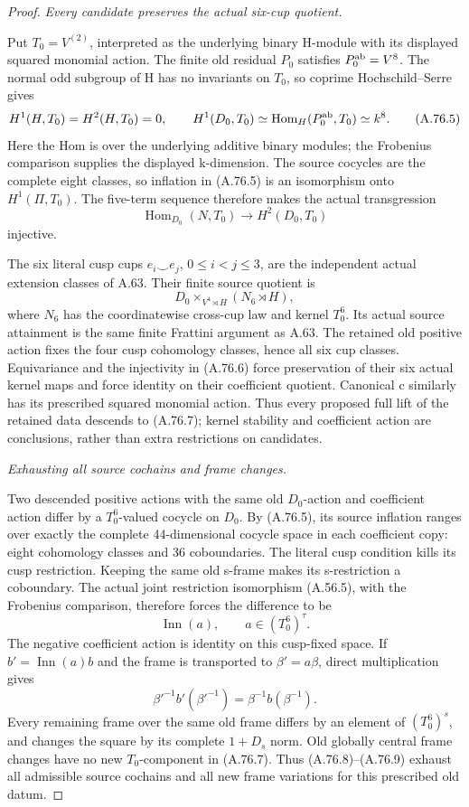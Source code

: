 \begin{proof}
\emph{Every candidate preserves the actual six-cup quotient.}\par
Put \(T_0=V^{(2)}\), interpreted as the underlying binary
H-module with its displayed squared monomial action. The finite
old residual \(P_0\) satisfies \(P_0^{\rm ab}=V^8\).
The normal odd subgroup of H has no invariants on \(T_0\), so
coprime Hochschild--Serre gives
\[
 H^1(H,T_0)=H^2(H,T_0)=0,
 \qquad H^1(D_0,T_0)
       \simeq\operatorname{Hom}_H(P_0^{\rm ab},T_0)
       \simeq k^8.
 \tag{A.76.5}
\]
Here the Hom is over the underlying additive binary modules;
the Frobenius comparison supplies the displayed k-dimension.
The source cocycles are the complete eight classes, so inflation
in (A.76.5) is an isomorphism onto \(H^1(\Pi,T_0)\).
The five-term sequence therefore makes the actual transgression
\[
 \operatorname{Hom}_{D_0}(N,T_0)
              \longrightarrow H^2(D_0,T_0)
 \tag{A.76.6}
\]
injective.

The six literal cusp cups \(e_i\smile e_j\), \(0\leq i<j\leq3\),
are the independent actual extension classes of A.63. Their finite
source quotient is
\[
 D_0\mathbin{\times}_{V^4\rtimes H}(N_6\rtimes H),
 \tag{A.76.7}
\]
where \(N_6\) has the coordinatewise cross-cup law and kernel
\(T_0^6\). Its actual source attainment is the same finite
Frattini argument as A.63. The retained old positive action fixes
the four cusp cohomology classes, hence all six cup classes.
Equivariance and the injectivity in (A.76.6) force preservation
of their six actual kernel maps and force identity on their
coefficient quotient. Canonical c similarly has its prescribed
squared monomial action. Thus every proposed full lift of the
retained data descends to (A.76.7); kernel stability and coefficient
action are conclusions, rather than extra restrictions on candidates.

\emph{Exhausting all source cochains and frame changes.}\par
Two descended positive actions with the same old \(D_0\)-action
and coefficient action differ by a \(T_0^6\)-valued cocycle on
\(D_0\). By (A.76.5), its source inflation ranges over exactly
the complete 44-dimensional cocycle space in each coefficient
copy: eight cohomology classes and 36 coboundaries. The literal
cusp condition kills its cusp restriction. Keeping the same old
s-frame makes its s-restriction a coboundary. The actual joint
restriction isomorphism (A.56.5), with the Frobenius comparison,
therefore forces the difference to be
\[
 \operatorname{Inn}(a),\qquad a\in(T_0^6)^\tau.
 \tag{A.76.8}
\]
The negative coefficient action is identity on this cusp-fixed
space. If \(b'=\operatorname{Inn}(a)b\) and the frame is
transported to \(\beta'=a\beta\), direct multiplication gives
\[
 \beta'^{-1}b'(\beta'^{-1})
                 =\beta^{-1}b(\beta^{-1}).
 \tag{A.76.9}
\]
Every remaining frame over the same old frame differs by an element
of \((T_0^6)^s\), and changes the square by its complete
\(1+D_s\) norm. Old globally central frame changes have no new
\(T_0\)-component in (A.76.7). Thus (A.76.8)--(A.76.9) exhaust
all admissible source cochains and all new frame variations for
this prescribed old datum.


\end{proof}
